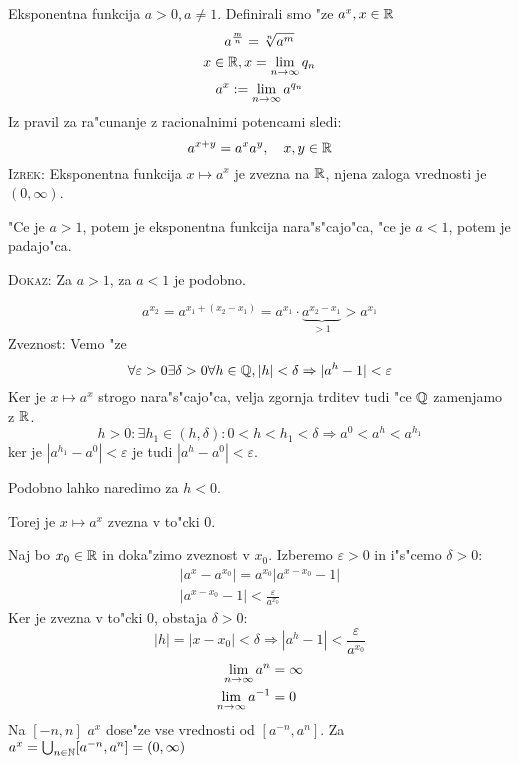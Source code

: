Eksponentna funkcija $a>0, a \neq 1$. Definirali smo "ze $a^x, x \in \mathbb{R}$
\begin{gather*}
a^{\frac{m}{n}} = \sqrt[n]{a^m} \\
x \in \mathbb{R}, x = \lim_{n \rightarrow \infty} q_n \\
a^x := \lim_{n \rightarrow \infty} a^{q_n}
\end{gather*}
Iz pravil za ra"cunanje z racionalnimi potencami sledi:
\begin{equation*}
a^{x+y} = a^x a^y, \quad x, y \in \mathbb{R}
\end{equation*}
\textsc{Izrek:} Eksponentna funkcija $x \mapsto a^x$ je zvezna na $\mathbb{R}$, njena zaloga vrednosti je $(0, \infty)$.

"Ce je $a> 1$, potem je eksponentna funkcija nara"s"cajo"ca, "ce je $a < 1$, potem je padajo"ca.

\textsc{Dokaz:} Za $a > 1$, za $a < 1$ je podobno. 

\begin{equation*}
a^{x_2} = a^{x_1 + (x_2 - x_1)} = a^{x_1} \cdot \underbrace{a^{x_2 - x_1}}_{> 1} > a^{x_1}
\end{equation*}
Zveznost: Vemo "ze
\begin{equation*}
\forall \varepsilon > 0 \exists \delta > 0 \forall h \in \mathbb{Q}, |h| < \delta \Rightarrow |a^h - 1| < \varepsilon
\end{equation*}
Ker je $x \mapsto a^x$ strogo nara"s"cajo"ca, velja zgornja trditev tudi "ce $\mathbb{Q}$ zamenjamo z $\mathbb{R}$.
\begin{equation*}
h>0: \exists h_1 \in (h, \delta): 0 < h < h_1 < \delta \Rightarrow a^0 < a^h < a^{h_1}
\end{equation*}
ker je $|a^{h_1} - a^0| < \varepsilon$ je tudi $|a^h - a^0| < \varepsilon$.

Podobno lahko naredimo za $h < 0$.

Torej je $x \mapsto a^x$ zvezna v to"cki 0.

Naj bo $x_0 \in \mathbb{R}$ in doka"zimo zveznost v $x_0$. Izberemo $\varepsilon > 0$ in i"s"cemo $\delta > 0$:
\begin{gather*}
|a^x - a^{x_0}| = a^{x_0} |a^{x - x_0} - 1| \\
|a^{x - x_0} - 1| < \frac{\varepsilon}{a^{x_0}}
\end{gather*}
Ker je zvezna v to"cki 0, obstaja $\delta > 0$:
\begin{equation*}
|h| = |x - x_0| < \delta \Rightarrow |a^h - 1| < \frac{\varepsilon}{a^{x_0}}
\end{equation*}
%
\begin{align*}
\lim_{n \rightarrow \infty} a^n &= \infty \\
\lim_{n \rightarrow \infty} a^{-1} &= 0
\end{align*}
Na $[-n, n]$ $a^x$ dose"ze vse vrednosti od $[a^{-n}, a^n]$. Za $a^x =\bigcup_{n \in \mathbb{N}} [a^{-n}, a^n] = (0, \infty)$

